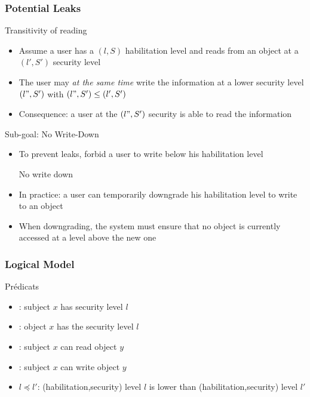 \begin{reveals}
\begin{frame}
\end{frame}




\begin{frame}
  \frametitle{Potential Leaks}

  \begin{block}{Transitivity of reading}
    \begin{itemize}
    \item Assume a user has a \((l,S)\) habilitation level and reads from 
      an object at a \((l',S')\) security level
    \item The user may \textit{at the same time} write the information
      at a lower security level \((l",S')\) with \((l",S')\le
      (l',S')\)
    \item Consequence: a user at the \((l",S')\) security is able to read the information
    \end{itemize}
  \end{block}

  \begin{block}{Sub-goal: No Write-Down}
    \begin{itemize}
    \item To prevent leaks, forbid a user to write below his
      habilitation level
      \begin{center}
        \color{red}No write down
      \end{center}
    \item In practice: a user can temporarily downgrade his habilitation
      level to write to an object
    \item When downgrading, the system must ensure that no object is
      currently accessed at a level above the new one
    \end{itemize}
  \end{block}



\end{frame}


\begin{frame}
  \frametitle{Logical Model}
  
  \begin{block}{Pr{\'e}dicats}
    \begin{itemize}
    \item {}: subject $x$ has security level $l$
    \item {}: object $x$ has the security level $l$
    \item {}:  subject $x$ can read object $y$
    \item {}: subject $x$ can write object $y$
    \item $l \preceq l'$: (habilitation,security) level $l$ is lower
      than (habilitation,security) level $l'$
    \end{itemize}
  \end{block}


\end{frame}
\end{reveals}
